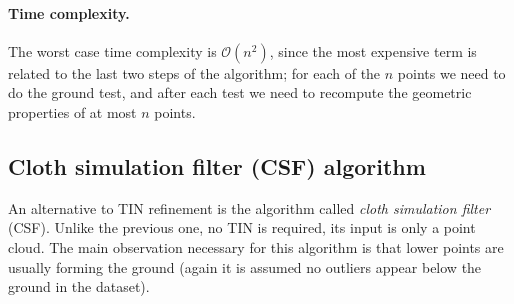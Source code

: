 %

\paragraph{Time complexity.} The worst case time complexity is $\mathcal{O}(n^2)$, since the most expensive term is related to the last two steps of the algorithm; for each of the $n$ points we need to do the ground test, and after each test we need to recompute the geometric properties of at most $n$ points.


%
\subsection{Cloth simulation filter (CSF) algorithm}

An alternative to TIN refinement is the algorithm called \emph{cloth simulation filter} (CSF).
Unlike the previous one, no TIN is required, its input is only a point cloud.
The main observation necessary for this algorithm is that lower points are usually forming the ground (again it is assumed no outliers appear below the ground in the dataset).

%

